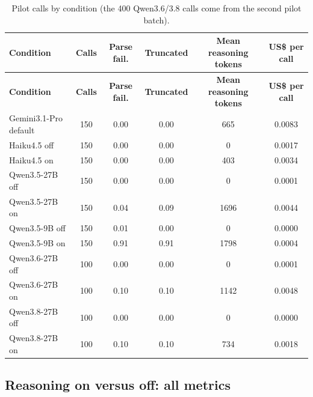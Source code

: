 \documentclass[10pt,a4paper]{article}
\begin{document}
\begin{footnotesize}
\setlength{\tabcolsep}{2pt}
\begin{longtable}{lccccc}
\caption{Pilot calls by condition (the 400 Qwen3.6/3.8 calls come from the second pilot batch).}\\
\toprule
\textbf{Condition} & \textbf{Calls} & \textbf{Parse fail.} & \textbf{Truncated} & \textbf{Mean reasoning tokens} & \textbf{US\$ per call} \\
\midrule
\endfirsthead
\toprule
\textbf{Condition} & \textbf{Calls} & \textbf{Parse fail.} & \textbf{Truncated} & \textbf{Mean reasoning tokens} & \textbf{US\$ per call} \\
\midrule
\endhead
\bottomrule
\endfoot
Gemini3.1-Pro \textbar{} default & 150 & 0.00 & 0.00 & 665 & 0.0083 \\
Haiku4.5 \textbar{} off & 150 & 0.00 & 0.00 & 0 & 0.0017 \\
Haiku4.5 \textbar{} on & 150 & 0.00 & 0.00 & 403 & 0.0034 \\
Qwen3.5-27B \textbar{} off & 150 & 0.00 & 0.00 & 0 & 0.0001 \\
Qwen3.5-27B \textbar{} on & 150 & 0.04 & 0.09 & 1696 & 0.0044 \\
Qwen3.5-9B \textbar{} off & 150 & 0.01 & 0.00 & 0 & 0.0000 \\
Qwen3.5-9B \textbar{} on & 150 & 0.91 & 0.91 & 1798 & 0.0004 \\
Qwen3.6-27B \textbar{} off & 100 & 0.00 & 0.00 & 0 & 0.0001 \\
Qwen3.6-27B \textbar{} on & 100 & 0.10 & 0.10 & 1142 & 0.0048 \\
Qwen3.8-27B \textbar{} off & 100 & 0.00 & 0.00 & 0 & 0.0000 \\
Qwen3.8-27B \textbar{} on & 100 & 0.10 & 0.10 & 734 & 0.0018 \\
\end{longtable}
\end{footnotesize}

\subsection{Reasoning on versus off: all metrics}
\end{document}
